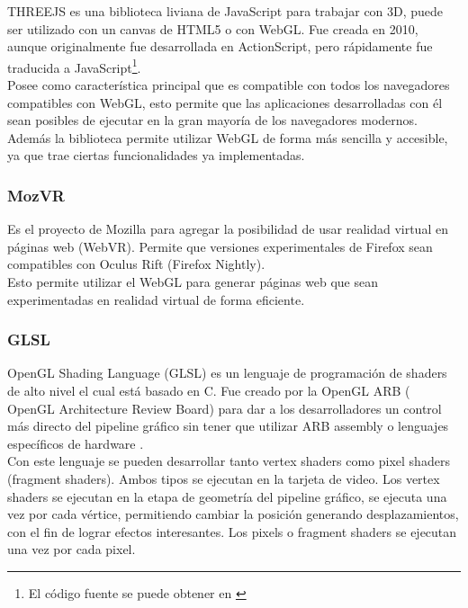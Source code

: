 \documentclass[12pt]{article}
\begin{document}
THREEJS es una biblioteca liviana\cite{three} de JavaScript para trabajar con 3D, puede ser utilizado con un canvas de HTML5 o con WebGL. Fue creada en 2010, aunque originalmente fue desarrollada en ActionScript, pero rápidamente fue traducida a JavaScript\footnote{El código fuente se puede obtener en \cite{codigothree}}.
\\Posee como característica principal que es compatible con todos los navegadores compatibles con WebGL, esto permite que las aplicaciones desarrolladas con él sean posibles de ejecutar en la gran mayoría de los navegadores modernos.
\\Además la biblioteca permite utilizar WebGL de forma más sencilla y accesible, ya que trae ciertas funcionalidades ya implementadas.
\subsubsection{MozVR}
Es el proyecto de Mozilla para agregar la posibilidad de usar realidad virtual en páginas web (WebVR)\cite{mozvr}. Permite que versiones experimentales de Firefox sean compatibles con Oculus Rift (Firefox Nightly\cite{nightly}).
\\Esto permite utilizar el WebGL para generar páginas web que sean experimentadas en realidad virtual de forma eficiente.
\subsubsection{GLSL}
OpenGL Shading Language (GLSL) es un lenguaje de programación de shaders de alto nivel el cual está basado en C. Fue creado por la OpenGL ARB ( OpenGL Architecture Review Board) para dar a los desarrolladores un control más directo del pipeline gráfico sin tener que utilizar ARB assembly o lenguajes específicos de hardware .
\\Con este lenguaje se pueden desarrollar tanto vertex shaders como pixel shaders (fragment shaders). Ambos tipos se ejecutan en la tarjeta de video. Los vertex shaders se ejecutan en la etapa de geometría del pipeline gráfico, se ejecuta una vez por cada vértice, permitiendo cambiar la posición generando desplazamientos, con el fin de lograr efectos interesantes. Los pixels o fragment shaders se ejecutan una vez por cada pixel.

\clearpage
\end{document}
